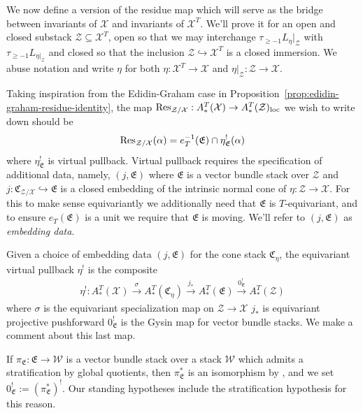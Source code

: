 \documentclass[12pt,dvipsnames]{amsart}
\begin{document}

We now define a version of the residue map which will serve as the bridge between invariants of \(\mathcal X\) and invariants of \(\mathcal X^T\). We'll prove it for an open and closed substack \(\mathcal Z\subseteq \mathcal X^T\), open so that we may interchange \(\tau_{\geq -1}L_\eta|_{\mathcal Z}\) with \(\tau_{\geq -1}L_{\eta|_{\mathcal Z}}\) and closed so that the inclusion \(\mathcal Z\hookrightarrow \mathcal X^T\) is a closed immersion. We abuse notation and write \(\eta\) for both \(\eta:\mathcal X^T\to \mathcal X\) and \(\eta|_{\mathcal Z}:\mathcal Z\to \mathcal X\).

Taking inspiration from the Edidin-Graham case in Proposition~\ref{prop:edidin-graham-residue-identity}, the map \(\operatorname{Res}_{\mathcal Z/\mathcal X}:A_*^T(\mathcal X)\to A_*^T(\mathcal Z)_{\operatorname{loc}}\) we wish to write down should be
\begin{align}\label{eqn:preliminary-Res-defn}
  \operatorname{Res}_{\mathcal Z/\mathcal X}(\alpha) = e_T^{-1}(\mathfrak E)\cap \eta^!_{\mathfrak E}(\alpha)
\end{align}
where \(\eta^!_{\mathfrak E}\) is virtual pullback. Virtual pullback requires the specification of additional data, namely, \((j,\mathfrak E)\) where \(\mathfrak E\) is a vector bundle stack over \(\mathcal Z\) and \(j:\mathfrak C_{\mathcal Z/\mathcal X}\hookrightarrow \mathfrak E\) is a closed embedding of the intrinsic normal cone of \(\eta:\mathcal Z\to \mathcal X\). For this to make sense equivariantly we additionally need that \(\mathfrak E\) is \(T\)-equivariant, and to ensure \(e_T(\mathfrak E)\) is a unit we require that \(\mathfrak E\) is moving. We'll refer to $(j,\mathfrak E)$ as \emph{embedding data}.

Given a choice of embedding data \((j, \mathfrak E)\) for the cone stack \(\mathfrak C_\eta\), the equivariant virtual pullback \(\eta^!\) \cite{manolache_VirtualPullbacks2012} is the composite
\begin{align*}
  \eta^!:A^T_*(\mathcal X) \xrightarrow{\sigma} A^T_*(\mathfrak C_\eta) \xrightarrow{j_*} A^T_*(\mathfrak E) \xrightarrow{0^!_{\mathfrak E}} A^T_*(\mathcal Z)
\end{align*}
where \(\sigma\) is the equivariant specialization map on \(\mathcal Z \to \mathcal X\) \(j_*\) is equivariant projective pushforward \(0^!_{\mathfrak E}\) is the Gysin map for vector bundle stacks. We make a comment about this last map.

 If \(\pi_{\mathfrak E}:\mathfrak E\to \mathcal W\) is a vector bundle stack over a stack \(\mathcal W\) which admits a stratification by global quotients, then \(\pi^*_{\mathfrak E}\) is an isomorphism by \cite[Prop. 5.3.2]{kresch_CycleGroupsArtin1999}, and we set \(0^!_{\mathfrak E} := (\pi^*_{\mathfrak E})^!\). Our standing hypotheses include the stratification hypothesis for this reason.
\end{document}
